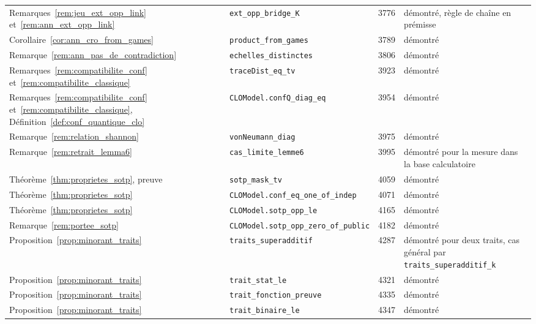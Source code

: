{\begin{longtable}{@{}p{4.6cm}p{5.2cm}p{0.9cm}>{\raggedright\arraybackslash}p{3.6cm}@{}}
Remarques~\ref{rem:jeu_ext_opp_link} et~\ref{rem:ann_ext_opp_link} & \texttt{ext\_\allowbreak{}opp\_\allowbreak{}bridge\_\allowbreak{}K} & 3776 & démontré, règle de chaîne en prémisse \\
Corollaire~\ref{cor:ann_cro_from_games} & \texttt{product\_\allowbreak{}from\_\allowbreak{}games} & 3789 & démontré \\
Remarque~\ref{rem:ann_pas_de_contradiction} & \texttt{echelles\_\allowbreak{}distinctes} & 3806 & démontré \\
Remarques~\ref{rem:compatibilite_conf} et~\ref{rem:compatibilite_classique} & \texttt{traceDist\_\allowbreak{}eq\_\allowbreak{}tv} & 3923 & démontré \\
Remarques~\ref{rem:compatibilite_conf} et~\ref{rem:compatibilite_classique}, Définition~\ref{def:conf_quantique_clo} & \texttt{CLOModel.confQ\_\allowbreak{}diag\_\allowbreak{}eq} & 3954 & démontré \\
Remarque~\ref{rem:relation_shannon} & \texttt{vonNeumann\_\allowbreak{}diag} & 3975 & démontré \\
Remarque~\ref{rem:retrait_lemma6} & \texttt{cas\_\allowbreak{}limite\_\allowbreak{}lemme6} & 3995 & démontré pour la mesure dans la base calculatoire \\
Théorème~\ref{thm:proprietes_sotp}, preuve & \texttt{sotp\_\allowbreak{}mask\_\allowbreak{}tv} & 4059 & démontré \\
Théorème~\ref{thm:proprietes_sotp} & \texttt{CLOModel.conf\_\allowbreak{}eq\_\allowbreak{}one\_\allowbreak{}of\_\allowbreak{}indep} & 4071 & démontré \\
Théorème~\ref{thm:proprietes_sotp} & \texttt{CLOModel.sotp\_\allowbreak{}opp\_\allowbreak{}le} & 4165 & démontré \\
Remarque~\ref{rem:portee_sotp} & \texttt{CLOModel.sotp\_\allowbreak{}opp\_\allowbreak{}zero\_\allowbreak{}of\_\allowbreak{}public} & 4182 & démontré \\
Proposition~\ref{prop:minorant_traits} & \texttt{traits\_\allowbreak{}superadditif} & 4287 & démontré pour deux traits, cas général par \texttt{traits\_\allowbreak{}superadditif\_\allowbreak{}k} \\
Proposition~\ref{prop:minorant_traits} & \texttt{trait\_\allowbreak{}stat\_\allowbreak{}le} & 4321 & démontré \\
Proposition~\ref{prop:minorant_traits} & \texttt{trait\_\allowbreak{}fonction\_\allowbreak{}preuve} & 4335 & démontré \\
Proposition~\ref{prop:minorant_traits} & \texttt{trait\_\allowbreak{}binaire\_\allowbreak{}le} & 4347 & démontré \\

\end{longtable}}
